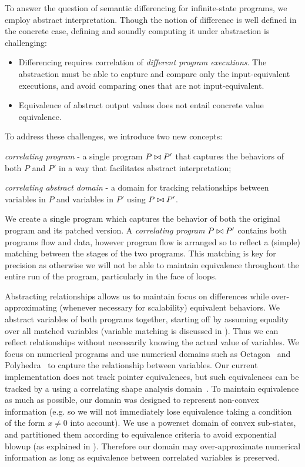 To answer the question of semantic differencing for infinite-state programs, we employ abstract interpretation. Though the notion of difference is well defined in the concrete case, defining and soundly computing it under abstraction is challenging:
\begin{itemize}
\item Differencing requires correlation of \emph{different program executions}. The abstraction must be able to capture and compare only the input-equivalent executions, and avoid comparing ones that are not input-equivalent.
\item Equivalence of abstract output values does not entail concrete value equivalence.
\end{itemize}

To address these challenges, we introduce two new concepts:
\begin{inparaenum}[(i)]
\item \emph{correlating program} - a single program $P \bowtie P'$ that captures the behaviors of both $P$ and $P'$ in a way that facilitates abstract interpretation;
\item \emph{correlating abstract domain} - a domain for tracking relationships between variables in $P$ and variables in $P'$ using $P \bowtie P'$.
\end{inparaenum}

We create a single program which captures the behavior of both the original program and its patched version. A \emph{correlating program} $P \bowtie P'$ contains both programs flow and data, however program flow is arranged so to reflect a (simple) matching between the stages of the two programs. This matching is key for precision as otherwise we will not be able to maintain equivalence throughout the entire run of the program, particularly in the face of loops.

Abstracting relationships allows us to maintain focus on differences while over-approximating (whenever necessary for scalability) equivalent behaviors. We abstract variables of both programs together, starting off by assuming equality over all matched variables (variable matching is discussed in ). Thus we can
reflect relationships without necessarily knowing the actual value of
variables. We focus on numerical programs and use numerical domains such as Octagon~\cite{Mine2006} and Polyhedra~\cite{CousotHalbwachs78} to capture the relationship between variables. Our current implementation does not track pointer equivalences, but such equivalences can be tracked by a using a correlating shape analysis domain~\cite{AmitRinetzkyRepsSagivYahav07}. To maintain equivalence as much as possible, our domain was designed to represent non-convex information (e.g. so we will not immediately lose equivalence taking a condition of the form $x \neq 0$ into account). We use a powerset domain of convex sub-states, and partitioned them according to equivalence criteria to avoid exponential blowup (as explained in ). Therefore our domain may over-approximate numerical information as long as equivalence between correlated variables is preserved.


